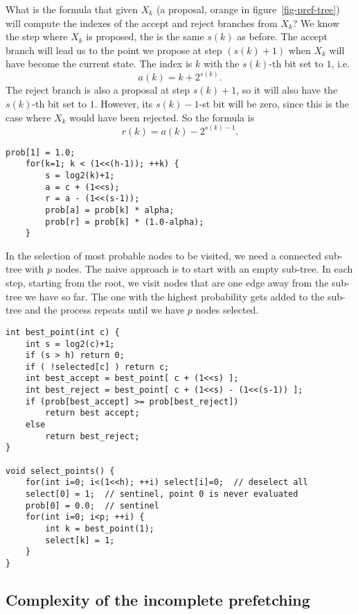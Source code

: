 \documentclass[11pt,letterpaper]{article}       %
\begin{document}
What is the formula that given $X_k$ (a proposal, orange in figure~\ref{fig-pref-tree})
will compute the indexes of the accept and reject branches from $X_k$? 
We know the step where $X_k$ is proposed, the is the same $s(k)$ as before.
The accept branch will lead us to the point we propose at step $(s(k)+1)$ when 
$X_k$ will have become the current state.  The index is $k$ with the $s(k)$-th bit set to $1$, i.e.
\begin{equation}
	a(k) = k + 2^{s(k)}.
\end{equation}
The reject branch is also a proposal at step $s(k)+1$, so it will also have the 
$s(k)$-th bit set to $1$.  However, its $s(k)-1$-st bit will be zero, since 
this is the case where $X_k$ would have been rejected.  So the formula is
\begin{equation}
	r(k) = a(k) - 2^{s(k)-1}.
\end{equation}
\begin{Verbatim}[frame=single]
    prob[1] = 1.0;
    for(k=1; k < (1<<(h-1)); ++k) {
        s = log2(k)+1;
        a = c + (1<<s);
        r = a - (1<<(s-1));
        prob[a] = prob[k] * alpha;
        prob[r] = prob[k] * (1.0-alpha);
    }
\end{Verbatim}

In the selection of most probable nodes to be visited, we need a connected sub-tree with 
$p$ nodes. 
The naive approach is to start with an empty sub-tree.  In each step, starting 
from the root, we visit nodes that are one 
edge away from the sub-tree we have so far. The one with the highest probability 
gets added to the sub-tree and the process repeats until we have $p$ nodes selected.  
\begin{Verbatim}[frame=single]
int best_point(int c) {
    int s = log2(c)+1;
    if (s > h) return 0;
    if ( !selected[c] ) return c;
    int best_accept = best_point[ c + (1<<s) ];
    int best_reject = best_point[ c + (1<<s) - (1<<(s-1)) ];
    if (prob[best_accept] >= prob[best_reject]) 
        return best accept; 
    else 
        return best_reject;
}

void select_points() {
    for(int i=0; i<(1<<h); ++i) select[i]=0;  // deselect all 
    select[0] = 1;  // sentinel, point 0 is never evaluated
    prob[0] = 0.0;  // sentinel 
    for(int i=0; i<p; ++i) {
        int k = best_point(1);
        select[k] = 1;
    }
}
\end{Verbatim}

\subsection{Complexity of the incomplete prefetching}
\end{document}
